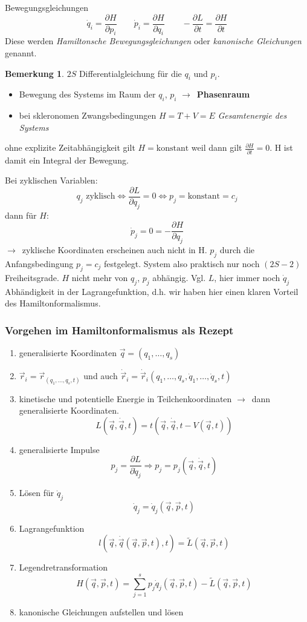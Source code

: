 \documentclass[oneside]{book}
\theoremstyle{definition}
\newtheorem*{bemerkung*}{Bemerkung}
\newcommand{\conseq}{$\rightarrow$~}
\newcommand{\ffpartial}[2]{\frac{\partial #1}{\partial #2}}
\newcommand{\dotvec}[1]{\dot{\vec{#1}}}
\newcommand{\const}{\text{konstant}}
\begin{document}
Bewegungsgleichungen
\[\dot q_i = \frac{\partial H}{\partial p_i}\qquad \dot p_i = \frac{\partial H}{\partial q_i} \qquad -\frac{\partial L}{\partial t} = \frac{\partial H}{\partial t}\]
Diese werden \emph{Hamiltonsche Bewegungsgleichungen} oder \emph{kanonische Gleichungen} genannt.

\begin{bemerkung*}
	$2S$ Differentialgleichung für die $q_i$ und $p_i$.
	\begin{itemize}
		\item Bewegung des Systems im Raum der $q_i$, $p_i$ \conseq \textbf{Phasenraum}
		\item bei skleronomen Zwangsbedingungen $H = T + V = E$ \textit{Gesamtenergie des Systems}
	\end{itemize}
\end{bemerkung*}
ohne explizite Zeitabhängigkeit gilt $H = \const$ weil dann gilt $\ffpartial{H}{t} = 0$. H ist damit ein Integral der Bewegung.

Bei zyklischen Variablen:
$$q_j \text{~zyklisch} \Leftrightarrow \ffpartial{L}{q_j} = 0 \Leftrightarrow p_j = \const = c_j$$
dann für $H$:
$$\dot{p}_j = 0 = -\ffpartial{H}{q_j}$$
\conseq zyklische Koordinaten erscheinen auch nicht in H.
$p_j$ durch die Anfangsbedingung $p_j = c_j$ festgelegt. System also praktisch nur noch $(2S -2)$ Freiheitsgrade.
$H$ nicht mehr von $q_j$, $p_j$ abhängig. Vgl. $L$, hier immer noch $\dot{q}_j$ Abhändigkeit in der Lagrangefunktion, d.h. wir haben hier einen klaren Vorteil des Hamiltonformalismus.

\subsubsection{Vorgehen im Hamiltonformalismus als Rezept}
\begin{enumerate}
	\item generalisierte Koordinaten $\vec{q} = (q_1, \dots, q_s)$
	\item $\vec{r}_i = \vec{r}_(q_1, \dots, q_s, t)$ und auch $\dotvec{r}_i = \dotvec{r}_i(q_1, \dots, q_s, \dot{q}_1, \dots, \dot{q}_s, t)$
	\item kinetische und potentielle Energie in Teilchenkoordinaten \conseq dann generalisierte Koordinaten.
	$$L(\vec{q}, \dotvec{q}, t) = t(\vec{q}, \dotvec q,t  - V(\vec{q}, t))$$
	\item generalisierte Impulse
	$$p_j = \ffpartial{L}{\dot{q}_j} \Rightarrow p_j = p_j(\vec{q}, \dotvec{q}, t)$$
	\item Lösen für $\dot{q}_j$
	$$\dot{q}_j = \dot{q}_j (\vec{q}, \vec{p}, t)$$
	\item Lagrangefunktion
	$$l(\vec{q}, \dotvec{q}(\vec{q}, \vec{p}, t), t) = \tilde{L}(\vec{q}, \vec{p}, t)$$
	\item Legendretransformation
	$$H(\vec{q}, \vec{p}, t) = \sum_{j=1}^s p_j \dot{q}_j(\vec{q}, \vec{p}, t) - \tilde{L}(\vec{q}, \vec{p}, t)$$
	\item kanonische Gleichungen aufstellen und lösen
\end{enumerate}
\end{document}
